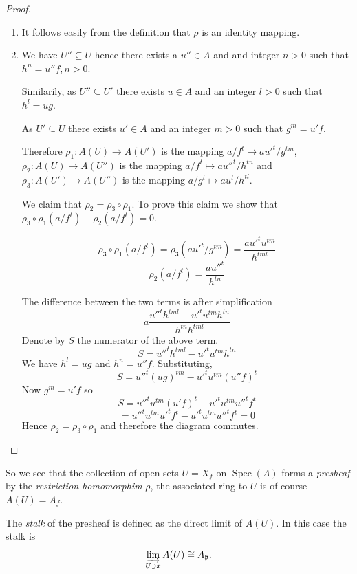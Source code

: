 \documentclass[]{report}
\DeclareMathOperator\Spec{Spec}
\newcommand\mfk[1]{\mathfrak{#1}}
\begin{document}
\begin{proof}
    \begin{enumerate}
        \item It follows easily from the definition that $\rho$ is an identity mapping. 
        \item We have $U'' \subseteq U$ hence there exists a $u'' \in A$ and and integer $n>0$ such that $h^n = u''f, n>0$.

            Similarily, as $U'' \subseteq U'$ there exists $u \in A$ and an integer $l > 0$ such that $h^l = ug$. 

            As $U' \subseteq U$ there exists $u' \in A$ and an integer $m > 0$ such that $g^m = u'f$.

            Therefore $\rho_1 : A(U) \rightarrow A(U')$ is the mapping $a/f^t \mapsto a{u'}^t/g^{tm}$, $\rho_2: A(U) \rightarrow A(U'')$ is the mapping $a/f^t \mapsto a{u''}^t/h^{tn}$ and $\rho_3: A(U') \rightarrow A(U'')$ is the mapping $a/g^t \mapsto au^t/h^{tl}$.

            We claim that $\rho_2 = \rho_3 \circ \rho_1$. To prove this claim we show that $\rho_3 \circ \rho_1 (a/f^t) - \rho_2(a/f^t) = 0$.

            $$\rho_3 \circ \rho_1 (a/f^t) = \rho_3(a{u'}^t/g^{tm}) = \frac{a{u'}^t u^{tm}}{h^{tml}}$$
            $$\rho_2(a/f^t) = \frac{a{u''}^t}{h^{tn}}$$
            
        The difference between the two terms is after simplification
        $$a\frac{{u''}^t h^{tml} - {u'}^t u^{tm} h^{tn}}{h^{tn} h^{tml}}$$
        Denote by $S$ the numerator of the above term. 
        $$S = {u''}^t h^{tml} - {u'}^t u^{tm} h^{tn}$$
        We have $h^l = ug$ and $h^n = u''f$. Substituting,
        $$S = {u''}^t (ug)^{tm} - {u'}^t u^{tm} (u''f)^t$$
        Now $g^m = u'f$ so 
        $$S = {u''}^t u^{tm} (u'f)^t - {u'}^t u^{tm} {u''}^t f^t$$
        $$= {u''}^t u^{tm} {u'}^t f^t - {u'}^t u^{tm} {u''}^t f^t = 0$$
        Hence $\rho_2 = \rho_3 \circ \rho_1$ and therefore the diagram commutes.
    \end{enumerate}
\end{proof}

So we see that the collection of open sets $U = X_f$ on $\Spec(A)$ forms a \textit{presheaf} by the \textit{restriction homomorphim} $\rho$, the associated ring to $U$ is of course $A(U) = A_f$.

The \textit{stalk} of the presheaf is defined as the direct limit of $A(U)$. In this case the stalk is
    $$\varinjlim_{U \ni x} A(U) \cong A_\mfk{p}.$$
\end{document}
